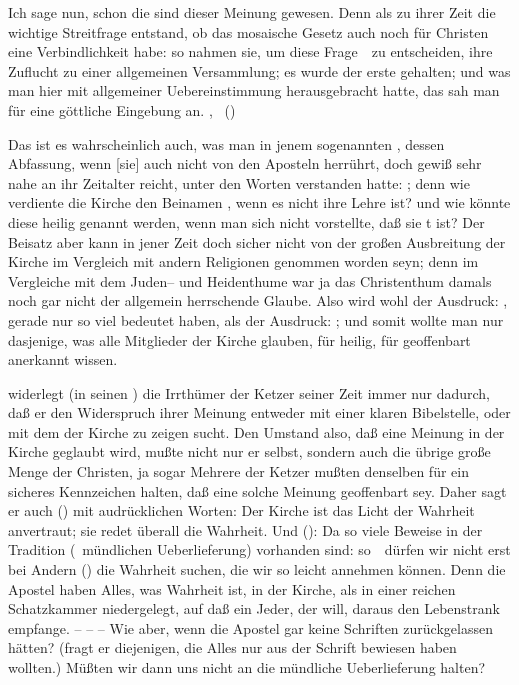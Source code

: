 \begin{aufza}
\item Ich sage nun, schon die  sind dieser Meinung gewesen. Denn als zu ihrer Zeit die wichtige Streitfrage entstand, ob das mosaische Gesetz auch noch für Christen eine Verbindlichkeit habe: so nahmen sie, um diese Frage~\ zu entscheiden, ihre Zuflucht zu einer allgemeinen Versammlung; es wurde der erste  gehalten; und was man hier mit allgemeiner Uebereinstimmung herausgebracht hatte, das sah man für eine göttliche Eingebung an. , \usw\ ()
\item Das ist es wahrscheinlich auch, was man in jenem sogenannten , dessen Abfassung, wenn [sie] auch nicht von den Aposteln herrührt, doch gewiß sehr nahe an ihr Zeitalter reicht, unter den Worten verstanden hatte: ; denn wie verdiente die Kirche den Beinamen , wenn es nicht ihre Lehre ist? und wie könnte diese heilig genannt werden, wenn man sich nicht vorstellte, daß sie t ist? Der Beisatz  aber kann in jener Zeit doch sicher nicht von der großen Ausbreitung der Kirche im Vergleich mit andern Religionen genommen worden seyn; denn im Vergleiche mit dem Juden-- und Heidenthume war ja das Christenthum damals noch gar nicht der allgemein herrschende Glaube. Also wird wohl der Ausdruck: , gerade nur so viel bedeutet haben, als der Ausdruck: ; und somit wollte man nur dasjenige, was alle Mitglieder der Kirche glauben, für heilig, für geoffenbart anerkannt wissen.
\item {} widerlegt (in seinen ) die Irrthümer der Ketzer seiner Zeit immer nur dadurch, daß er den Widerspruch ihrer Meinung entweder mit einer klaren Bibelstelle, oder mit dem  der Kirche zu zeigen sucht. Den Umstand also, daß eine Meinung in der Kirche  geglaubt wird, mußte nicht nur er selbst, sondern auch die übrige große Menge der Christen, ja sogar Mehrere der Ketzer mußten denselben für ein sicheres Kennzeichen halten, daß eine solche Meinung geoffenbart sey. Daher sagt er auch () mit audrücklichen Worten: Der Kirche ist das Licht der Wahrheit anvertraut; sie redet überall die Wahrheit. Und (): Da so viele Beweise in der Tradition (\dh\ mündlichen Ueberlieferung) vorhanden sind: so~\ dürfen wir nicht erst bei Andern () die Wahrheit suchen, die wir so leicht  annehmen können. Denn die Apostel haben Alles, was Wahrheit ist, in der Kirche, als in einer reichen Schatzkammer niedergelegt, auf daß ein Jeder, der will, daraus den Lebenstrank empfange. -- -- -- Wie aber, wenn die Apostel gar keine Schriften zurückgelassen hätten? (fragt er diejenigen, die Alles nur aus der Schrift bewiesen haben wollten.) Müßten wir dann uns nicht an die mündliche Ueberlieferung halten? \usw\

\end{aufza}
